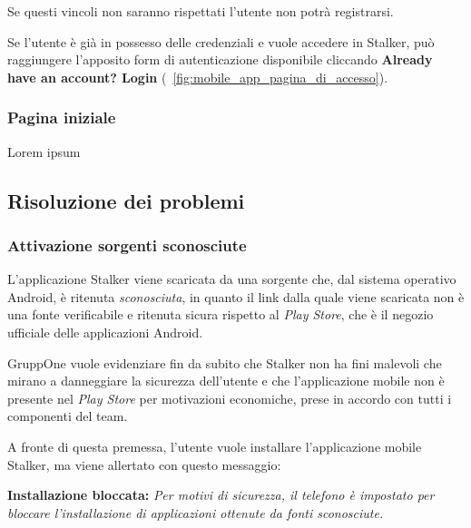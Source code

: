 \documentclass[../manuale-utente.tex]{subfiles}
\begin{document}
Se questi vincoli non saranno rispettati l'utente non potrà registrarsi.

Se l'utente è già in possesso delle credenziali e vuole accedere in Stalker, può raggiungere l'apposito form di autenticazione disponibile cliccando \textbf{Already have an account? Login} (~\ref{fig:mobile_app_pagina_di_accesso}).
\newpage

\subsubsection{Pagina iniziale}%
\label{subs:pagina_iniziale}


Lorem ipsum
\newpage


\subsection{Risoluzione dei problemi}%
\label{subs:mobile_app_risoluzione_problemi}

\subsubsection{Attivazione sorgenti sconosciute}%
\label{subs:mobile_app_attivare_sorgenti_sconosciute}

L'applicazione Stalker viene scaricata da una sorgente che, dal sistema operativo Android, è ritenuta \textit{sconosciuta}, in quanto il link dalla quale viene scaricata non è una fonte verificabile e ritenuta sicura rispetto al \textit{Play Store}, che è il negozio ufficiale delle applicazioni Android.

GruppOne vuole evidenziare fin da subito che Stalker non ha fini malevoli che mirano a danneggiare la sicurezza dell'utente e che l'applicazione mobile non è presente nel \textit{Play Store} per motivazioni economiche, prese in accordo con tutti i componenti del team.

A fronte di questa premessa, l'utente vuole installare l'applicazione mobile Stalker, ma viene allertato con questo messaggio:

\textbf{Installazione bloccata:} \textit{Per motivi di sicurezza, il telefono è impostato per bloccare l’installazione di applicazioni ottenute da fonti sconosciute.}
\end{document}
